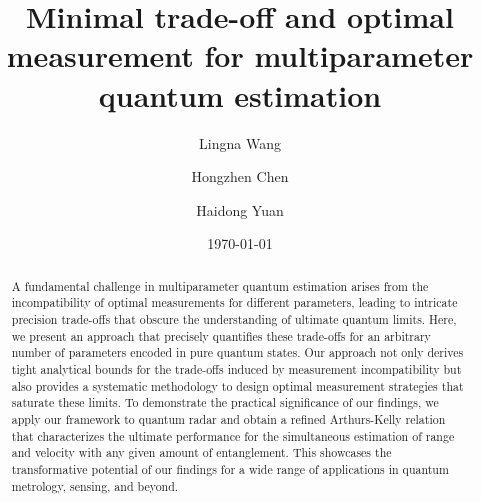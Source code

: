 \documentclass[
aps,
prl,
twocolumn,

superscriptaddress]{revtex4-2}
\begin{document}
	\title{Minimal trade-off and optimal measurement for multiparameter quantum estimation}
	\author{Lingna Wang}
 	\author{Hongzhen Chen}
	\author{Haidong Yuan}

	\date{\today}

	\begin{abstract}
A fundamental challenge in multiparameter quantum estimation arises from the incompatibility of optimal measurements for different parameters, leading to intricate precision trade-offs that obscure the understanding of ultimate quantum limits. Here, we present an approach that precisely quantifies these trade-offs for an arbitrary number of parameters encoded in pure quantum states. Our approach not only derives tight analytical bounds for the trade-offs induced by measurement incompatibility but also provides a systematic methodology to design optimal measurement strategies that saturate these limits. To demonstrate the practical significance of our findings, we apply our framework to quantum radar and obtain a refined Arthurs-Kelly relation that characterizes the ultimate performance for the simultaneous estimation of range and velocity with any given amount of entanglement. This showcases the transformative potential of our findings for a wide range of applications in quantum metrology, sensing, and beyond.

	\end{abstract}
 \maketitle
\end{document}
